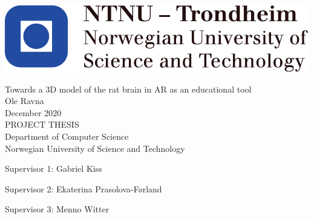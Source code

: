 
\thispagestyle{empty}
\includegraphics[scale=1.1]{fig/NTNU}
\mbox{}\\[6pc]
\begin{center}
\Huge{Towards a 3D model of the rat brain in AR as an educational tool}\\[2pc]

\Large{Ole Ravna}\\[1pc]
\large{December 2020}\\[2pc]

PROJECT THESIS\\
Department of Computer Science\\
Norwegian University of Science and Technology
\end{center}
\vfill

\noindent Supervisor 1: Gabriel Kiss 

\noindent Supervisor 2: Ekaterina Prasolova-Førland

\noindent Supervisor 3: Menno Witter

